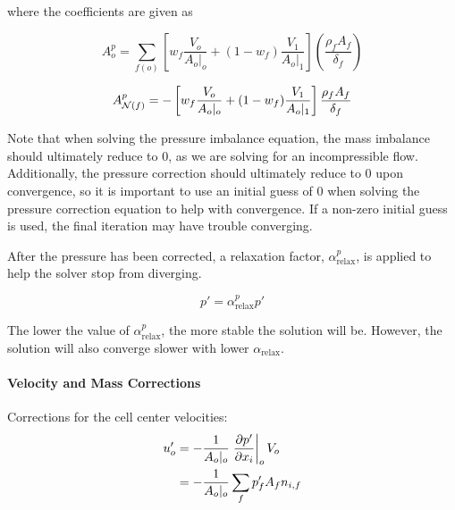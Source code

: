 \noindent where the coefficients are given as

\begin{equation}
A_o^p = \sum_{f(o)} \left[ w_f \frac{V_o}{A_o\rvert_o} + (1-w_f) \frac{V_1}{A_o\rvert_1} \right] \left( \frac{\rho_f A_f}{\delta_f} \right)
\end{equation}

\begin{equation}
A_{\mathcal{N}(f)}^p = - \left[ w_f \frac{V_o}{A_o\rvert_o} + (1-w_f) \frac{V_1}{A_o \rvert_1} \right] \frac{\rho_f A_f}{\delta_f}
\end{equation}

Note that when solving the pressure imbalance equation, the mass imbalance should ultimately reduce to 0, as we are solving for an incompressible flow. Additionally, the pressure correction should ultimately reduce to 0 upon convergence, so it is important to use an initial guess of 0 when solving the pressure correction equation to help with convergence. If a non-zero initial guess is used, the final iteration may have trouble converging.

%


After the pressure has been corrected, a relaxation factor, $\alpha^p_{\mathrm{relax}}$, is applied to help the solver stop from diverging. 

\begin{equation}
p' = \alpha^p_{\mathrm{relax}}p'
\end{equation}

The lower the value of $\alpha^p_{\mathrm{relax}}$, the more stable the solution will be. However, the solution will also converge slower with lower $\alpha_{\mathrm{relax}}$. 




\paragraph{Velocity and Mass Corrections}


Corrections for the cell center velocities: 
\begin{align}
u_o' &= -\frac{1}{A_o \rvert_o} \left. \pdv{p'}{x_i} \right|_o V_o  \\
	 &= - \frac{1}{A_o\rvert_o} \sum_{f} p_f' A_f n_{i,f}
\end{align}

